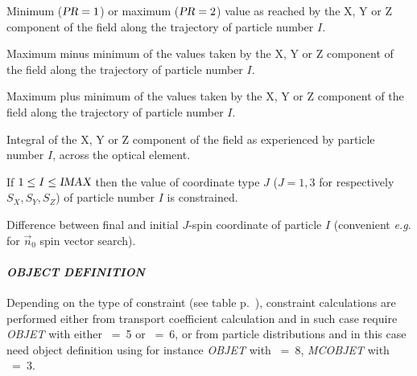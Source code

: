 {\smallskip

 Minimum ($\textsl{PR}=1$) or maximum ($\textsl{PR}=2$) value as reached by the X, Y or Z component 
of the field along the trajectory of particle number $I$.

\smallskip

 Maximum minus minimum of the values taken by the X, Y or Z component 
of the field along the trajectory of particle number $I$.

\smallskip

 Maximum plus minimum of the values taken by the X, Y or Z component 
of the field along the trajectory of particle number $I$.

\smallskip

 Integral of the X, Y or Z component of the field as experienced by 
particle number $I$, across the optical element. 


\smallskip

 If $1\leq I\leq \textsl{IMAX}$ then the value of coordinate type $J$ ($J=1,3$ for respectively 
 $S_X, S_Y, S_Z$) of particle number $I$ is constrained.  

\smallskip

 Difference between final and initial $J$-spin coordinate  of particle $I$ (convenient 
\emph{e.g.} for $\vec n_0$ spin vector search).   





\paragraph{\textsl{OBJECT DEFINITION}}


\noindent Depending on the type of constraint (see table p.~\pageref{TabFITZlst1}), constraint calculations are performed either from 
transport coefficient calculation and in such case require  \textsl{OBJET} with either \KOBJ~=~5  
or  \KOBJ~=~6, or from particle distributions and in this case need  object definition using for 
instance \textsl{OBJET} with \KOBJ~=~8,    \textsl{MCOBJET} with  \KOBJ~=~3. 



}
